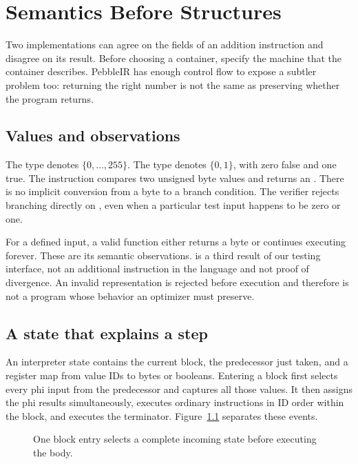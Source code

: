 \chapter{Semantics Before Structures}
\label{ch:pebble-semantics}

Two implementations can agree on the fields of an addition instruction and disagree on its result.
Before choosing a container, specify the machine that the container describes.
PebbleIR has enough control flow to expose a subtler problem too: returning the right number is not the same as preserving whether the program returns.

\section{Values and observations}
\label{sec:pebble-observations}
The type  denotes $\{0,\ldots,255\}$.
The type  denotes $\{0,1\}$, with zero false and one true.
The instruction  compares two unsigned byte values and returns an .
There is no implicit conversion from a byte to a branch condition.
The verifier rejects branching directly on , even when a particular test input happens to be zero or one.

For a defined input, a valid function either returns a byte or continues executing forever.
These are its semantic observations.
 is a third result of our testing interface, not an additional instruction in the language and not proof of divergence.
An invalid representation is rejected before execution and therefore is not a program whose behavior an optimizer must preserve.

\section{A state that explains a step}
\label{sec:pebble-state}
An interpreter state contains the current block, the predecessor just taken, and a register map from value IDs to bytes or booleans.
Entering a block first selects every phi input from the predecessor and captures all those values.
It then assigns the phi results simultaneously, executes ordinary instructions in ID order within the block, and executes the terminator.
Figure~\ref{fig:pebble-step} separates these events.

\begin{figure}[htbp]
\centering
{}
\caption{One block entry selects a complete incoming state before executing the body.}
\label{fig:pebble-step}
\end{figure}

